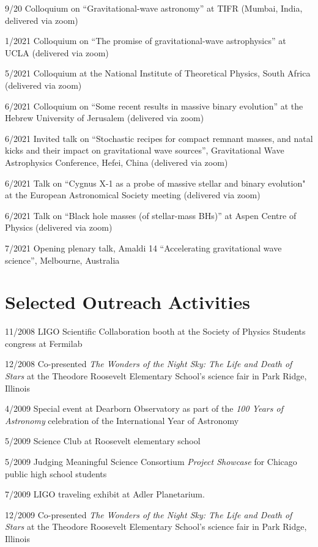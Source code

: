 \documentclass[margin,line]{res}
\begin{document}
\begin{resume}
9/20 Colloquium on  ``Gravitational-wave astronomy'' at TIFR (Mumbai, India, delivered via zoom)

1/2021 Colloquium on ``The promise of gravitational-wave astrophysics'' at UCLA (delivered via zoom)

5/2021 Colloquium at the National Institute of Theoretical Physics, South Africa (delivered via zoom)

6/2021 Colloquium on ``Some recent results in massive binary evolution''  at the Hebrew University of Jerusalem (delivered via zoom)

6/2021 Invited talk on ``Stochastic recipes for compact remnant masses, and natal kicks and their impact on gravitational wave sources'', Gravitational Wave Astrophysics Conference, Hefei, China  (delivered via zoom)

6/2021 Talk on ``Cygnus X-1 as a probe of massive stellar and binary evolution" at the European Astronomical Society meeting (delivered via zoom)

6/2021 Talk on ``Black hole masses (of stellar-mass BHs)'' at Aspen Centre of Physics (delivered via zoom)

7/2021 Opening plenary talk, Amaldi 14 ``Accelerating gravitational wave science'', Melbourne, Australia



\section{\sc Selected Outreach Activities}
11/2008 	LIGO Scientific Collaboration booth at the Society of Physics Students congress at Fermilab

12/2008 	Co-presented {\it The Wonders of the Night Sky: The Life and Death of Stars} at the Theodore Roosevelt Elementary School's science fair in Park Ridge, Illinois

4/2009 	Special event at Dearborn Observatory as part of the {\it 100 Years of Astronomy} celebration of the International Year of Astronomy

5/2009	Science Club at Roosevelt elementary school

5/2009	Judging Meaningful Science Consortium {\it Project Showcase} for Chicago public high school students

7/2009 	 LIGO traveling exhibit at Adler Planetarium. 

12/2009 	Co-presented {\it The Wonders of the Night Sky: The Life and Death of Stars} at the Theodore Roosevelt Elementary School's science fair in Park Ridge, Illinois


\end{resume}
\end{document}
